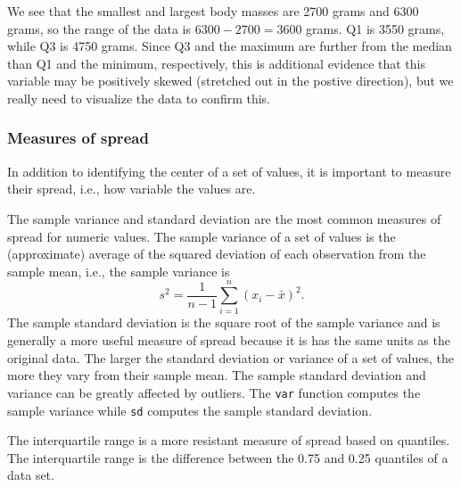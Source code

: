 \documentclass[
]{book}
\newenvironment{Shaded}{\begin{snugshade}}{\end{snugshade}}
\newcommand{\AttributeTok}[1]{\textcolor[rgb]{0.77,0.63,0.00}{#1}}
\newcommand{\ConstantTok}[1]{\textcolor[rgb]{0.00,0.00,0.00}{#1}}
\newcommand{\DecValTok}[1]{\textcolor[rgb]{0.00,0.00,0.81}{#1}}
\newcommand{\DocumentationTok}[1]{\textcolor[rgb]{0.56,0.35,0.01}{\textbf{\textit{#1}}}}
\newcommand{\FloatTok}[1]{\textcolor[rgb]{0.00,0.00,0.81}{#1}}
\newcommand{\FunctionTok}[1]{\textcolor[rgb]{0.00,0.00,0.00}{#1}}
\newcommand{\NormalTok}[1]{#1}
\newcommand{\SpecialCharTok}[1]{\textcolor[rgb]{0.00,0.00,0.00}{#1}}
\theoremstyle{definition}
\theoremstyle{definition}
\theoremstyle{definition}
\theoremstyle{definition}
\theoremstyle{remark}
\begin{document}
\begin{Shaded}
\end{Shaded}

We see that the smallest and largest body masses are 2700 grams and 6300 grams, so the range of the data is \(6300 - 2700 = 3600\) grams. Q1 is 3550 grams, while Q3 is 4750 grams. Since Q3 and the maximum are further from the median than Q1 and the minimum, respectively, this is additional evidence that this variable may be positively skewed (stretched out in the postive direction), but we really need to visualize the data to confirm this.

\hypertarget{measures-of-spread}{%
\subsubsection{Measures of spread}\label{measures-of-spread}}

In addition to identifying the center of a set of values, it is important to measure their spread, i.e., how variable the values are.

The sample variance and standard deviation are the most common measures of spread for numeric values. The sample variance of a set of values is the (approximate) average of the squared deviation of each observation from the sample mean, i.e., the sample variance is \[s^2 = \frac{1}{n-1}\sum_{i=1}^n (x_i - \bar{x})^2.\] The sample standard deviation is the square root of the sample variance and is generally a more useful measure of spread because it is has the same units as the original data. The larger the standard deviation or variance of a set of values, the more they vary from their sample mean. The sample standard deviation and variance can be greatly affected by outliers. The \texttt{var} function computes the sample variance while \texttt{sd} computes the sample standard deviation.

The interquartile range is a more resistant measure of spread based on quantiles. The interquartile range is the difference between the 0.75 and 0.25 quantiles of a data set.
\end{document}
